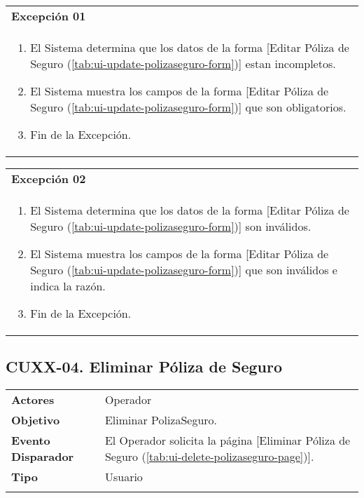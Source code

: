 \begin{tabular}{ p{15.5cm} }
	\textbf{Excepción 01} \\
	\begin{enumerate}
		\item El Sistema determina que los datos de la forma [Editar Póliza de Seguro (\ref{tab:ui-update-polizaseguro-form})] estan incompletos.
		\item El Sistema muestra los campos de la forma [Editar Póliza de Seguro (\ref{tab:ui-update-polizaseguro-form})] que son obligatorios.
		\item Fin de la Excepción.
	\end{enumerate}
\end{tabular}

\begin{tabular}{ p{15.5cm} }
	\textbf{Excepción 02} \\
	\begin{enumerate}
		\item El Sistema determina que los datos de la forma [Editar Póliza de Seguro (\ref{tab:ui-update-polizaseguro-form})] son inválidos.
		\item El Sistema muestra los campos de la forma [Editar Póliza de Seguro (\ref{tab:ui-update-polizaseguro-form})] que son inválidos e indica la razón.
		\item Fin de la Excepción.
	\end{enumerate}
\end{tabular}


\clearpage
\subsection{CUXX-04. Eliminar Póliza de Seguro} \label{sec:cu-delete-PolizaSeguro}

\begin{tabular}{ p{3.5cm} p{11.5cm} }
	\textbf{Actores} & Operador\\
	\textbf{Objetivo} & Eliminar PolizaSeguro.\\
	\textbf{Evento Disparador} & El Operador solicita la página [Eliminar Póliza de Seguro (\ref{tab:ui-delete-polizaseguro-page})].\\
	\textbf{Tipo} & Usuario\\
	\\
\end{tabular}

